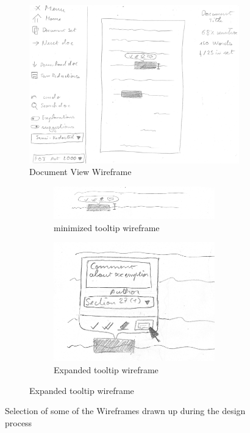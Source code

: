 \documentclass[\version]{l4proj}
\begin{document}
\begin{figure}[H]
    \centering
    \begin{subfigure}[b]{\linewidth}
        \centering
        \includegraphics[width=0.7\linewidth]{images/wireframes/doc_view.jpg}
        \caption{Document View Wireframe}\label{fig:document-wireframe}
    \end{subfigure}
    \begin{subfigure}[b]{\linewidth}
        \begin{subfigure}[b]{0.59\linewidth}
            \includegraphics[width=\linewidth]{images/wireframes/tooltip.jpg}
            \caption{minimized tooltip wireframe}\label{fig:tooltip-wireframe}
        \end{subfigure}
        \begin{subfigure}[b]{0.4\linewidth}
            \includegraphics[width=\linewidth]{images/wireframes/tooltip_comment.jpg}
            \caption{Expanded tooltip wireframe}\label{fig:expanded-tooltip-wireframe}
        \end{subfigure}
    \end{subfigure}
    \caption{Selection of some of the Wireframes drawn up during the design process}\label{fig:wireframes}

\end{figure}
\end{document}
